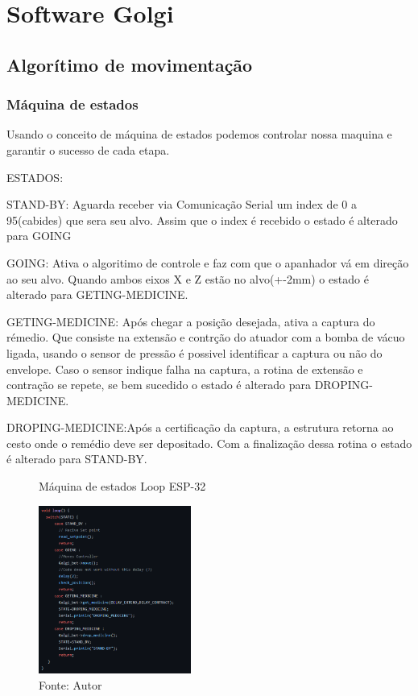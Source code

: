 \documentclass[../poliXuniversity_hospital_(USP)_report.tex]{subfiles}
\begin{document}
\chapter{Software Golgi}

\section{Algorítimo de movimentação}

\subsection{Máquina de estados}

Usando o conceito de máquina de estados podemos controlar nossa maquina e garantir o sucesso de cada etapa.

ESTADOS:

STAND-BY: Aguarda receber via Comunicação Serial um index de 0 a 95(cabides) que sera seu alvo. Assim que o index é recebido o estado é alterado para GOING

GOING: Ativa o algoritimo de controle e faz com que o apanhador vá em direção ao seu alvo. Quando ambos eixos X e Z estão no alvo(+-2mm) o estado é alterado para GETING-MEDICINE. 

GETING-MEDICINE: Após chegar a posição desejada, ativa a captura do rémedio. Que consiste na extensão e contrção do atuador com a bomba de vácuo ligada, usando o sensor de pressão é possivel identificar a captura ou não do envelope. Caso o sensor indique falha na captura, a rotina de extensão e contração se repete, se bem sucedido o estado é alterado para DROPING-MEDICINE.

DROPING-MEDICINE:Após a certificação da captura, a estrutura retorna ao cesto onde o remédio deve ser depositado. Com a finalização dessa rotina o estado é alterado para STAND-BY.
\begin{figure}[h]
\centering
    \caption{Máquina de estados Loop ESP-32}
    \centering %
    \includegraphics[width=5cm]{images/maquina_de_estados.png}
    \caption*{Fonte: Autor}
    \label{figura: Máquina de estados Loop ESP-32}
\end{figure}
\end{document}
